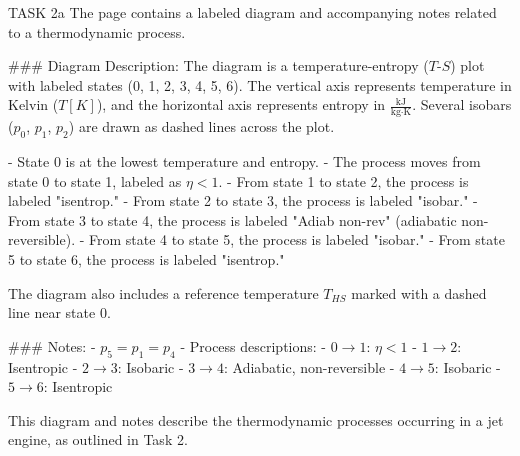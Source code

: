 TASK 2a  
The page contains a labeled diagram and accompanying notes related to a thermodynamic process.  

### Diagram Description:  
The diagram is a temperature-entropy (\( T \)-\( S \)) plot with labeled states (0, 1, 2, 3, 4, 5, 6). The vertical axis represents temperature in Kelvin (\( T [K] \)), and the horizontal axis represents entropy in \( \frac{\text{kJ}}{\text{kg·K}} \). Several isobars (\( p_0 \), \( p_1 \), \( p_2 \)) are drawn as dashed lines across the plot.  

- State 0 is at the lowest temperature and entropy.  
- The process moves from state 0 to state 1, labeled as \( \eta < 1 \).  
- From state 1 to state 2, the process is labeled "isentrop."  
- From state 2 to state 3, the process is labeled "isobar."  
- From state 3 to state 4, the process is labeled "Adiab non-rev" (adiabatic non-reversible).  
- From state 4 to state 5, the process is labeled "isobar."  
- From state 5 to state 6, the process is labeled "isentrop."  

The diagram also includes a reference temperature \( T_{HS} \) marked with a dashed line near state 0.  

### Notes:  
- \( p_5 = p_1 = p_4 \)  
- Process descriptions:  
  - \( 0 \to 1 \): \( \eta < 1 \)  
  - \( 1 \to 2 \): Isentropic  
  - \( 2 \to 3 \): Isobaric  
  - \( 3 \to 4 \): Adiabatic, non-reversible  
  - \( 4 \to 5 \): Isobaric  
  - \( 5 \to 6 \): Isentropic  

This diagram and notes describe the thermodynamic processes occurring in a jet engine, as outlined in Task 2.